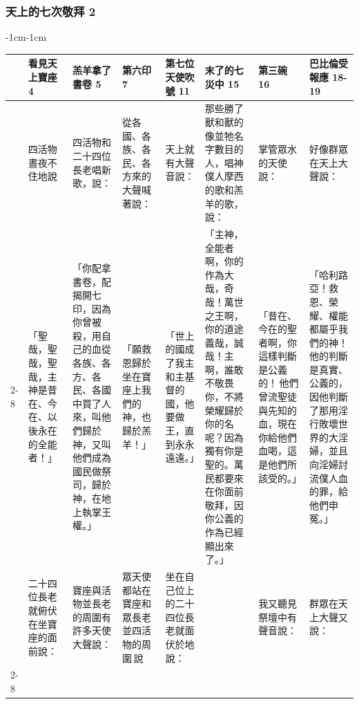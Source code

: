 \subsubsection{天上的七次敬拜 2}
\begin{changemargin}{-1cm}{-1cm}
\begin{table} %
\centering
\begin{tabular}{ |p{.3cm}|p{2.5cm}|p{3.5cm}| p{2.5cm}|p{5cm}|p{3.5cm}|p{2cm}|p{4cm}|  }\hline
&看見天上寶座  4 & 羔羊拿了書卷 5 & 第六印 7&第七位天使吹號 11 &末了的七災中 15&第三碗 16 & 巴比倫受報應 18-19 \\\hline
\multicolumn{1}{|m{.3cm}|}{}&
\multicolumn{1}{m{2.5cm}|}{四活物晝夜不住地說}  &
\multicolumn{1}{m{3.5cm}|}{四活物和二十四位長老唱新歌，說：}  &
 \multicolumn{1}{m{2.5cm}|}{從各國、各族、各民、各方來的大聲喊著說：} &
 \multicolumn{1}{m{5cm}|}{天上就有大聲音說：}  &
 \multicolumn{1}{m{3.5cm}|}{那些勝了獸和獸的像並牠名字數目的人，唱神僕人摩西的歌和羔羊的歌，說：}   &
 \multicolumn{1}{m{2.5cm}|}{掌管眾水的天使說：}  &  
 \multicolumn{1}{m{4cm}|}{好像群眾在天上大聲說：} \\\cline{2-8}
 
\multicolumn{1}{|m{.3cm}|}{第一次}&
\multicolumn{1}{m{2.5cm}|}{「聖哉，聖哉，聖哉，主神是昔在、今在、以後永在的全能者！」}  &
\multicolumn{1}{m{3.5cm}|}{「你配拿書卷，配揭開七印，因為你曾被殺，用自己的血從各族、各方、各民、各國中買了人來，叫他們歸於神，又叫他們成為國民做祭司，歸於神，在地上執掌王權。」}  &
 \multicolumn{1}{m{2.5cm}|}{「願救恩歸於坐在寶座上我們的神，也歸於羔羊！」} &
 \multicolumn{1}{m{5cm}|}{「世上的國成了我主和主基督的國，他要做王，直到永永遠遠。」}  &
 \multicolumn{1}{m{3.5cm}|}{「主神，全能者啊，你的作為大哉，奇哉！萬世之王啊，你的道途義哉，誠哉！主啊，誰敢不敬畏你，不將榮耀歸於你的名呢？因為獨有你是聖的。萬民都要來在你面前敬拜，因你公義的作為已經顯出來了。」}   &
 \multicolumn{1}{m{2.5cm}|}{「昔在、今在的聖者啊，你這樣判斷是公義的！ 他們曾流聖徒與先知的血，現在你給他們血喝，這是他們所該受的。」}  &  
 \multicolumn{1}{m{4cm}|}{「哈利路亞！救恩、榮耀、權能都屬乎我們的神！他的判斷是真實、公義的，因他判斷了那用淫行敗壞世界的大淫婦，並且向淫婦討流僕人血的罪，給他們申冤。」 } \\\hline 
 
 
 
 
 \multicolumn{1}{|m{.3cm}|}{}&
\multicolumn{1}{m{2.5cm}|}{二十四位長老就俯伏在坐寶座的面前說：  }  &
\multicolumn{1}{m{3.5cm}|}{寶座與活物並長老的周圍有許多天使大聲說：}  &
 \multicolumn{1}{m{2.5cm}|}{眾天使都站在寶座和眾長老並四活物的周圍 說} &
 \multicolumn{1}{m{5cm}|}{坐在自己位上的二十四位長老就面伏於地說：}  &
 \multicolumn{1}{m{3.5cm}|}{}   &
 \multicolumn{1}{m{2.5cm}|}{我又聽見祭壇中有聲音說：}  &  
 \multicolumn{1}{m{4cm}|}{群眾在天上大聲又說：} \\\cline{2-8}
 

\end{tabular}
\end{table}
\end{changemargin}
